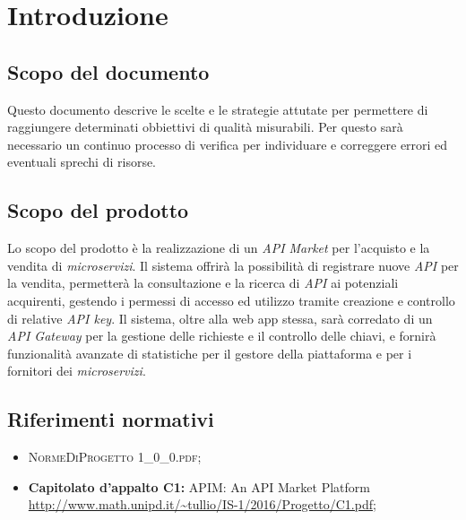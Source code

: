 \newpage
\section{Introduzione}

\subsection{Scopo del documento}
Questo documento descrive le scelte e le strategie attutate per permettere di raggiungere determinati obbiettivi di qualità misurabili. Per questo sarà necessario un continuo processo di verifica per individuare e correggere errori ed eventuali sprechi di risorse.

\subsection{Scopo del prodotto}
Lo scopo del prodotto è la realizzazione di un \textit{API Market} per l'acquisto e la vendita di \textit{microservizi}. Il sistema offrirà la possibilità di registrare nuove \textit{API} per la vendita, permetterà la consultazione e la ricerca di \textit{API} ai potenziali acquirenti, gestendo i permessi di accesso ed utilizzo tramite creazione e controllo di relative \textit{API key}. Il sistema, oltre alla web app stessa, sarà corredato di un \textit{API Gateway} per la gestione delle richieste e il controllo delle chiavi, e fornirà funzionalità avanzate di statistiche per il gestore della piattaforma e per i fornitori dei \textit{microservizi}.

\subsection{Riferimenti normativi}
\begin{itemize}
\item \textsc{NormeDiProgetto 1\_0\_0.pdf};
\item \textbf{Capitolato d’appalto C1:} APIM: An API Market Platform\\ \url{http://www.math.unipd.it/~tullio/IS-1/2016/Progetto/C1.pdf};
\end{itemize}


